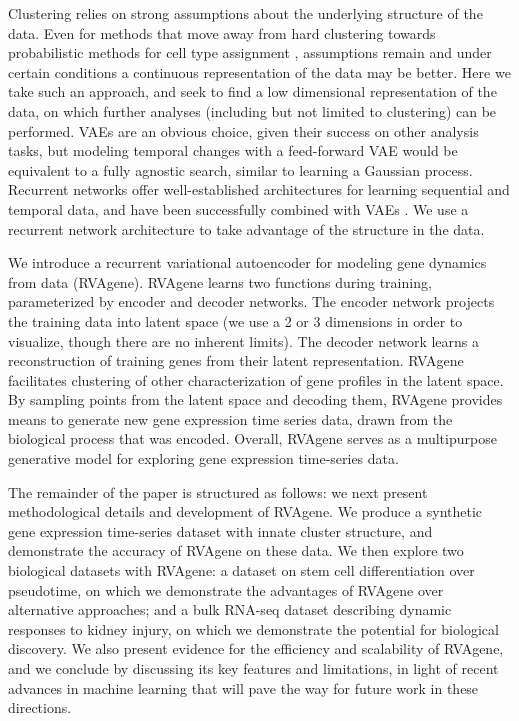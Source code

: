 \par
Clustering relies on strong assumptions about the underlying structure of the data. Even for methods that move away from hard clustering towards probabilistic methods for cell type assignment \citep{jetka2018information, zhu2019semisoft}, assumptions remain and under certain conditions a continuous representation of the data may be better. 
Here we take such an approach, and seek to find a low dimensional representation of the data, on which further analyses (including but not limited to clustering) can be performed. VAEs are an obvious choice, given their success on other \scrna analysis tasks, but modeling temporal changes with a feed-forward VAE would be equivalent to a fully agnostic search, similar to learning a Gaussian process. Recurrent networks offer well-established architectures for learning sequential and temporal data, and have been successfully combined with VAEs  \citep{Fabius2015}. We use a recurrent network architecture to take advantage of the structure in the data.
\par 
We introduce a recurrent variational autoencoder for modeling gene dynamics from \scrna data (RVAgene). RVAgene learns two functions during training, parameterized by encoder and decoder networks. The encoder network projects the training data into latent space (we use a 2 or 3 dimensions in order to visualize, though there are no inherent limits). The decoder network learns a reconstruction of training genes from their latent representation. RVAgene facilitates clustering of other characterization of gene profiles in the latent space. By sampling points from the latent space and decoding them, RVAgene provides means to generate new gene expression time series data, drawn from the biological process that was encoded. Overall, RVAgene serves as a multipurpose generative model for exploring gene expression time-series data. 
\par 
The remainder of the paper is structured as follows: we next present methodological details and development of RVAgene. We produce a synthetic gene expression time-series dataset with innate cluster structure, and demonstrate the accuracy of RVAgene on these data.
{We then explore two biological datasets with RVAgene: a \scrna dataset on stem cell differentiation over pseudotime, on which we demonstrate the advantages of RVAgene over alternative approaches; and a bulk RNA-seq dataset describing dynamic responses to kidney injury, on which we demonstrate the potential for biological discovery. We also present evidence for the efficiency and scalability of RVAgene, and we conclude by discussing its key features and limitations, in light of recent advances in machine learning that will pave the way for future work in these directions.
}
